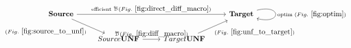 \[
\begin{tikzcd}
    \Source \ar[rrr,"\text{efficient }\Dsynrevsymbol (Fig.~\ref{fig:direct_diff_macro})"] \ar[dr,"(Fig.~\ref{fig:source_to_unf})"'] &&& \Target \arrow[r,loop right,"\text{optim }(Fig.~\ref{fig:optim})"] \\
    & Source\UNFSymbol \ar[r,"\Dsynrevsymbol (Fig.~\ref{fig:diff_macro})"] & Target\UNFSymbol \ar[ur,"(Fig.~\ref{fig:unf_to_target})"'] & 
\end{tikzcd}
\]